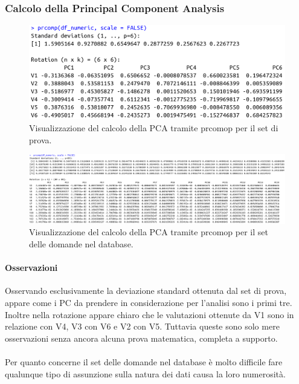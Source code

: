 \subsubsection{Calcolo della Principal Component Analysis}
\label{Calcolo della Principal Component Analysis}
\begin{figure}[H]
\centering
	\includegraphics[width=0.80\linewidth]{../../PCA/plot/prcomp_rete-prova.png}
	\caption{Visualizzazione del calcolo della PCA tramite prcomop per il set di prova.}
	\label{Visualizzazione del calcolo della PCA tramite prcomop per il set di prova.}
\end{figure}

\begin{figure}[H]
\centering
	\includegraphics[width=1\linewidth]{../../PCA/plot/prcomp_rete-db.png}
	\caption{Visualizzazione del calcolo della PCA tramite prcomop per il set delle domande nel database.}
	\label{Visualizzazione del calcolo della PCA tramite prcomop per il set delle domande nel database.}
\end{figure}
\noindent

\paragraph{Osservazioni}
Osservando  esclusivamente la deviazione standard ottenuta dal set di prova, appare come i PC da prendere in considerazione per l'analisi sono i primi tre. Inoltre  nella rotazione appare chiaro che le valutazioni ottenute da V1 sono in relazione con V4, V3 con V6 e V2 con V5. Tuttavia queste sono solo mere osservazioni senza ancora alcuna prova matematica,  completa a supporto. \\\\ Per quanto concerne il set delle domande nel database \`e molto difficile fare qualunque tipo di assunzione sulla natura dei dati causa la loro numerosit\`a.


